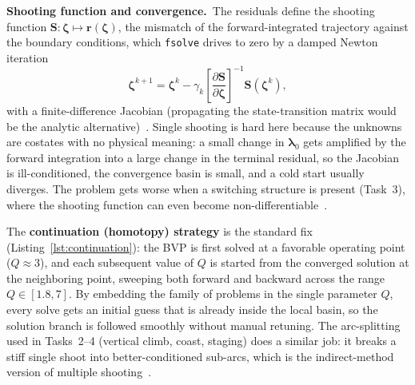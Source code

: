 \documentclass[../main.tex]{subfiles}
\begin{document}
\textbf{Shooting function and convergence.}\ The residuals define the shooting function $\mathbf{S}:\boldsymbol{\zeta}\mapsto\mathbf{r}(\boldsymbol{\zeta})$, the mismatch of the forward-integrated trajectory against the boundary conditions, which \texttt{fsolve} drives to zero by a damped Newton iteration
\begin{equation}
    \boldsymbol{\zeta}^{k+1} = \boldsymbol{\zeta}^{k}
    - \gamma_k\left[\frac{\partial\mathbf{S}}{\partial\boldsymbol{\zeta}}\right]^{-1}\!\mathbf{S}(\boldsymbol{\zeta}^{k}),
    \label{eq:newton}
\end{equation}
with a finite-difference Jacobian (propagating the state-transition matrix would be the analytic alternative)~\cite[Lecture~5]{dclvnotes}. Single shooting is hard here because the unknowns are costates with no physical meaning: a small change in $\boldsymbol{\lambda}_0$ gets amplified by the forward integration into a large change in the terminal residual, so the Jacobian is ill-conditioned, the convergence basin is small, and a cold start usually diverges. The problem gets worse when a switching structure is present (Task~3), where the shooting function can even become non-differentiable~\cite[Lecture~6]{dclvnotes}.

The \textbf{continuation (homotopy) strategy} is the standard fix (Listing~\ref{lst:continuation}): the BVP is first solved at a favorable operating point ($Q \approx 3$), and each subsequent value of $Q$ is started from the converged solution at the neighboring point, sweeping both forward and backward across the range $Q \in [1.8, 7]$. By embedding the family of problems in the single parameter $Q$, every solve gets an initial guess that is already inside the local basin, so the solution branch is followed smoothly without manual retuning. The arc-splitting used in Tasks~2--4 (vertical climb, coast, staging) does a similar job: it breaks a stiff single shoot into better-conditioned sub-arcs, which is the indirect-method version of multiple shooting~\cite[Lecture~5]{dclvnotes}.
\end{document}
